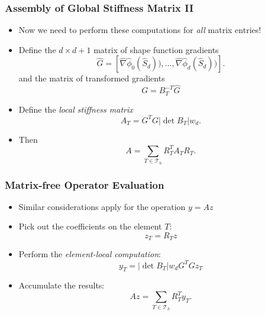 \documentclass[aspectratio=169,11pt]{beamer}
\theoremstyle{definition}
\begin{document}
\begin{frame}
\frametitle{Assembly of Global Stiffness Matrix II}
\begin{itemize}
\item Now we need to perform these computations for {\em  all} matrix entries!
\item Define the $d\times d+1$ matrix of shape function gradients
\begin{equation*}
\hat G = \left[\hat\nabla\hat\phi_0(\hat S_d)),\ldots,\hat\nabla\hat\phi_d(\hat S_d))\right] .
\end{equation*}
and the matrix of transformed gradients $$G=B_T^{-T} \hat G$$
\item Define the {\em local stiffness matrix}
\begin{equation*}
A_T = G^T G |\det B_T| w_d .
\end{equation*}
\item Then
\begin{equation*}
A =  \sum_{T\in\mathcal{T}_h} R_T^T A_T R_T .
\end{equation*}
\end{itemize}
\end{frame}

\begin{frame}
\frametitle{Matrix-free Operator Evaluation}
\begin{itemize}
\item Similar considerations apply for the operation $y=Az$
\item Pick out the coefficients on the element $T$:
$$z_T = R_T z$$
\item Perform the {\em element-local computation}:
\begin{equation*}
y_T = |\det B_T| w_d G^T G z_T
\end{equation*}
\item Accumulate the results:
\begin{equation*}
Az =  \sum_{T\in\mathcal{T}_h} R_T^T y_T.
\end{equation*}
\end{itemize}
\end{frame}
\end{document}
